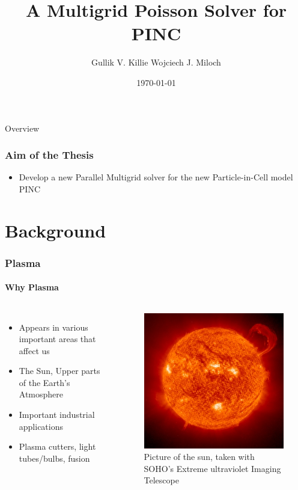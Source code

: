 \documentclass{beamer}
\title{A Multigrid Poisson Solver for PINC}
\date{\today}
\author[Author]{Gullik V. Killie \hspace*{3.6cm}Wojciech J. Miloch}
\begin{document}
\begin{frame}
\titlepage
\end{frame}
%
\begin{frame}{Overview}
\tableofcontents
\end{frame}
\begin{frame}
	\frametitle{Aim of the Thesis}
	\begin{itemize}
		\item Develop a new Parallel Multigrid solver for the new Particle-in-Cell model PINC
	\end{itemize}
\end{frame}
\section{Background} %
\label{sec:Background}
\begin{frame}
	\frametitle{Plasma}
	\framesubtitle{Why Plasma}
	\begin{columns}
		\begin{itemize}
			\item Appears in various important areas that affect us
			\item The Sun, Upper parts of the Earth's Atmosphere
			\item Important industrial applications
			\item Plasma cutters, light tubes/bulbs, fusion
		\end{itemize}
		\begin{figure}
			\centering
			\includegraphics[width = \textwidth]{figures/sun}
			\caption{Picture of the sun, taken with SOHO's Extreme ultraviolet Imaging Telescope \citep{_sun_????}}
		\end{figure}
	\end{columns}
\end{frame}
\end{document}
